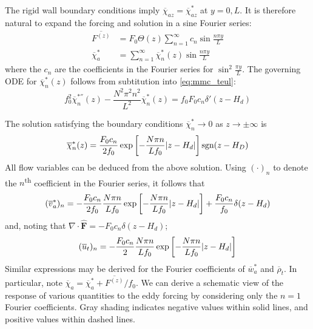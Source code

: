 \documentclass{jknotes}
\begin{document}
The rigid wall boundary conditions imply $\overline{\chi}_{az} =
\overline{\chi}_{az}^*$ at $y=0,L$. It is therefore natural to expand the
forcing and solution in a sine Fourier series:
\begin{align}
	\overline{F^{(z)}} &= F_0 \Theta(z) \sum_{n=1}^\infty c_n \sin \frac{n \pi
	y}{L} \\
	\overline{\chi}_a^* &= \sum_{n=1}^\infty \overline{\chi}_n^*(z) \sin
	\frac{n \pi y}{L}
\end{align}
where the $c_n$ are the coefficients in the Fourier series for $\sin^2
\frac{\pi y}{L}$. The governing ODE for
$\overline{\chi}_n^*(z)$ follows from subtitution into \eqref{eq:mmc_teul}:
\begin{equation}
	f_0^2 \overline{\chi}_n^{*''}(z) - \frac{N^2 \pi^2 n^2}{L^2}
	\overline{\chi}_n^*(z) = f_0 F_0 c_n \delta'(z-H_d)
\end{equation}

The solution satisfying the boundary conditions $\overline{\chi}_n^* \to 0$ as
$z \to \pm \infty$ is
\begin{equation}
	\overline{\chi}_n^*(z) = \frac{F_0 c_n}{2f_0} \exp \left[ -\frac{N \pi
	n}{L f_0} \abs{z-H_d}\right] \text{sgn}(z-H_D)
\end{equation}
All flow variables can be deduced from the above solution. Using $(\cdot)_n$
to denote the $n$\textsuperscript{th} coefficient in the Fourier series, it
follows that
\begin{equation}
	(\overline{v}_a^*)_n = -\frac{F_0 c_n}{2f_0} \frac{N \pi n}{L f_0}
	\exp\left[ -\frac{N\pi n}{L f_0} \abs{z-H_d}\right] + \frac{F_0 c_n}{f_0}
	\delta (z-H_d)
\end{equation}
and, noting that $\nabla \cdot \hat{\symbf{F}} = -F_0 c_n \delta(z-H_d)$;
\begin{equation}
	(\overline{u}_t)_n = -\frac{F_0c_n}{2} \frac{N \pi n}{L f_0} \exp \left[
	-\frac{N \pi n}{L f_0} \abs{z-H_d}\right]
\end{equation}
Similar expressions may be derived for the Fourier coefficients of
$\overline{w}_a^*$ and $\overline{\rho}_t$. In particular, note
$\overline{\chi}_a = \overline{\chi}_a^* + \overline{F^{(z)}}/f_0$. We can
derive a schematic view of the response of various quantities to the eddy
forcing by considering only the $n=1$ Fourier coefficients. Gray shading
indicates negative values within solid lines, and positive values within
dashed lines.
\end{document}

